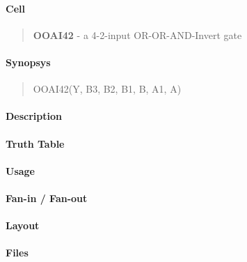 \label{OOAI42}
\paragraph{Cell}
\begin{quote}
    \textbf{OOAI42} - a 4-2-input OR-OR-AND-Invert gate
\end{quote}

\paragraph{Synopsys}
\begin{quote}
    OOAI42(Y, B3, B2, B1, B, A1, A)
\end{quote}

\paragraph{Description}

%

\paragraph{Truth Table}
%

\paragraph{Usage}

\paragraph{Fan-in / Fan-out}

\paragraph{Layout}

\paragraph{Files}

